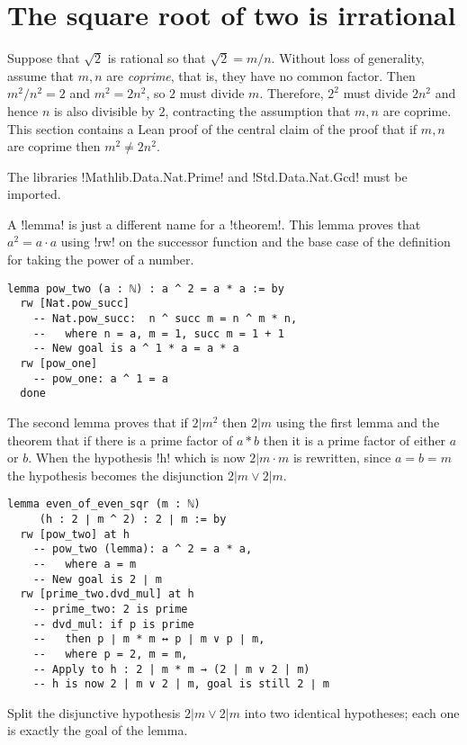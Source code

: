 
\section{The square root of two is irrational}

Suppose that $\sqrt{2}$ is rational so that $\sqrt{2}=m/n$. Without loss of generality, assume that $m,n$ are \emph{coprime}, that is, they have no common factor. Then $m^2/n^2=2$ and $m^2=2n^2$, so $2$ must divide $m$. Therefore, $2^2$ must divide $2n^2$ and hence $n$ is also divisible by $2$, contracting the assumption that $m,n$ are coprime. This section contains a Lean proof of the central claim of the proof that if $m,n$ are coprime then $m^2\neq 2n^2$.

The libraries !Mathlib.Data.Nat.Prime! and !Std.Data.Nat.Gcd! must be imported.

A !lemma! is just a different name for a !theorem!. This lemma proves that $a^2=a\cdot a$ using !rw! on the successor function and the base case of the definition for taking the power of a number.
\begin{Verbatim}
lemma pow_two (a : ℕ) : a ^ 2 = a * a := by
  rw [Nat.pow_succ]
    -- Nat.pow_succ:  n ^ succ m = n ^ m * n,
    --   where n = a, m = 1, succ m = 1 + 1
    -- New goal is a ^ 1 * a = a * a
  rw [pow_one]
    -- pow_one: a ^ 1 = a
  done
\end{Verbatim}

The second lemma proves that if $2 | m^2$ then $2 | m$ using the first lemma and the theorem that if there is a prime factor of $a*b$ then it is a prime factor of either $a$ or $b$. When the hypothesis !h! which is now $2| m \cdot m$ is rewritten, since $a=b=m$ the hypothesis becomes the disjunction $2 | m \vee 2 | m$.
\begin{Verbatim}[firstnumber=last]
lemma even_of_even_sqr (m : ℕ)
     (h : 2 ∣ m ^ 2) : 2 ∣ m := by
  rw [pow_two] at h
    -- pow_two (lemma): a ^ 2 = a * a,
    --   where a = m
    -- New goal is 2 ∣ m
  rw [prime_two.dvd_mul] at h
    -- prime_two: 2 is prime
    -- dvd_mul: if p is prime 
    --   then p ∣ m * m ↔ p ∣ m ∨ p ∣ m,
    --   where p = 2, m = m,
    -- Apply to h : 2 | m * m → (2 | m ∨ 2 | m)
    -- h is now 2 | m ∨ 2 | m, goal is still 2 ∣ m
\end{Verbatim}

Split the disjunctive hypothesis $2 | m \vee 2 | m$ into two identical hypotheses; each one is exactly the goal of the lemma.

